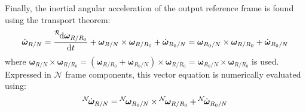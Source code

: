 Finally, the inertial angular acceleration of the output reference frame is found using the transport theorem:
\begin{equation}
	\label{eq:mRot6}
	\dot{\bm\omega}_{R/N} = 
	\frac{\leftexp{R}{\D} {\bm\omega}_{R/R_{0}}}{\D t} 
	 + \bm\omega_{R/N} \times {\bm\omega}_{R/R_{0}}
	+ \dot{\bm\omega}_{R_{0}/N}
	= \bm\omega_{R_{0}/N} \times {\bm\omega}_{R/R_{0}}
	+ \dot{\bm\omega}_{R_{0}/N}
\end{equation}
where $\bm\omega_{R/N} \times {\bm\omega}_{R/R_{0}} = (\bm\omega_{R/R_{0}} +\bm\omega_{R_{0}/N}) \times {\bm\omega}_{R/R_{0}} = \bm\omega_{R_{0}/N} \times {\bm\omega}_{R/R_{0}}$ is used.  Expressed in $\mathcal{N}$ frame components, this vector equation is numerically evaluated using:
\begin{equation}
	\label{eq:mRot7}
	\leftexp{N}{\dot{\bm\omega}}_{R/N} = \leftexp{N}{\bm\omega}_{R_{0}/N} \times \leftexp{N}{\bm\omega}_{R/R_{0}}
	+ \leftexp{N}{\dot{\bm\omega}}_{R_{0}/N}
\end{equation}




